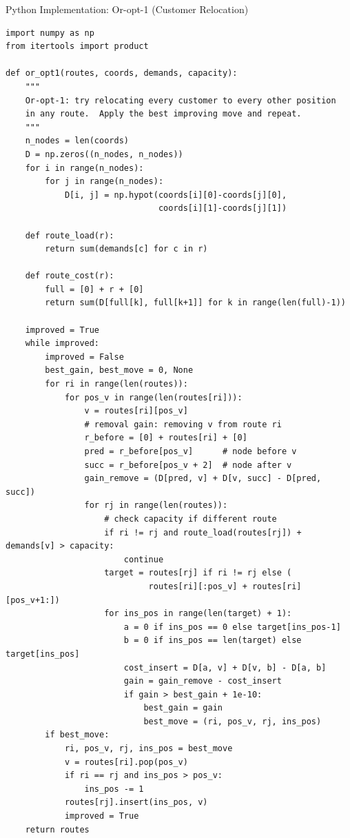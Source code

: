 \documentclass[aspectratio=169,10pt]{beamer}
\begin{document}
\begin{frame}[fragile]{Python Implementation: Or-opt-1 (Customer Relocation)}
\begin{lstlisting}
import numpy as np
from itertools import product

def or_opt1(routes, coords, demands, capacity):
    """
    Or-opt-1: try relocating every customer to every other position
    in any route.  Apply the best improving move and repeat.
    """
    n_nodes = len(coords)
    D = np.zeros((n_nodes, n_nodes))
    for i in range(n_nodes):
        for j in range(n_nodes):
            D[i, j] = np.hypot(coords[i][0]-coords[j][0],
                               coords[i][1]-coords[j][1])

    def route_load(r):
        return sum(demands[c] for c in r)

    def route_cost(r):
        full = [0] + r + [0]
        return sum(D[full[k], full[k+1]] for k in range(len(full)-1))

    improved = True
    while improved:
        improved = False
        best_gain, best_move = 0, None
        for ri in range(len(routes)):
            for pos_v in range(len(routes[ri])):
                v = routes[ri][pos_v]
                # removal gain: removing v from route ri
                r_before = [0] + routes[ri] + [0]
                pred = r_before[pos_v]      # node before v
                succ = r_before[pos_v + 2]  # node after v
                gain_remove = (D[pred, v] + D[v, succ] - D[pred, succ])
                for rj in range(len(routes)):
                    # check capacity if different route
                    if ri != rj and route_load(routes[rj]) + demands[v] > capacity:
                        continue
                    target = routes[rj] if ri != rj else (
                             routes[ri][:pos_v] + routes[ri][pos_v+1:])
                    for ins_pos in range(len(target) + 1):
                        a = 0 if ins_pos == 0 else target[ins_pos-1]
                        b = 0 if ins_pos == len(target) else target[ins_pos]
                        cost_insert = D[a, v] + D[v, b] - D[a, b]
                        gain = gain_remove - cost_insert
                        if gain > best_gain + 1e-10:
                            best_gain = gain
                            best_move = (ri, pos_v, rj, ins_pos)
        if best_move:
            ri, pos_v, rj, ins_pos = best_move
            v = routes[ri].pop(pos_v)
            if ri == rj and ins_pos > pos_v:
                ins_pos -= 1
            routes[rj].insert(ins_pos, v)
            improved = True
    return routes
\end{lstlisting}
\end{frame}
\end{document}
